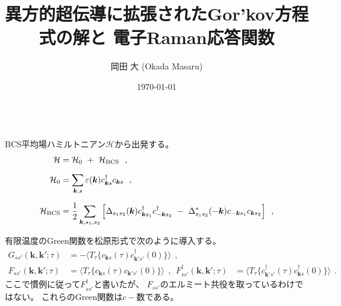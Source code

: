 \documentclass[a4j]{jsarticle}
\title{
\hspace{3em} 異方的超伝導に拡張されたGor'kov方程式の解と \newline 電子Raman応答関数
}
\author{岡田 大 (Okada Masaru)}
\date{\today}
\begin{document}
\maketitle

\ \\[-15mm]

BCS平均場ハミルトニアン$\mathcal{H}$から出発する。
\begin{align}
	\mathcal{H}
	 & =
	\mathcal{H}_{0}
	\ + \
	\mathcal{H}_{\rm BCS}
	\ \ ,
	\nonumber \\[2mm]
	\mathcal{H}_{0}
	 & =
	\sum_{\bm{k},s}
	\varepsilon(\bm{k})
	c_{\bm{k} s}^{\dagger}
	c_{\bm{k} s}
	\ \ ,
	\nonumber \\[2mm]
	\mathcal{H}_{\rm BCS}
	 & =
	\dfrac{1}{2}
	\sum_{\bm{k},s_{1},s_{2}}
	\Big[
		\Delta_{ s_{1} s_{2} }( \bm{k} )
		c_{\bm{k} s_{1}}^{\dagger}
		c_{-\bm{k} s_{2}}^{\dagger}
		\ - \
		\Delta_{ s_{1} s_{2} }^{*}( - \bm{k} )
		c_{-\bm{k} s_{1}}
		c_{\bm{k} s_{2}}
		\Big]
	\ \ ,
\end{align}

有限温度のGreen関数を松原形式で次のように導入する。
\begin{align}
	G_{ss'}(\bm{k} , \bm{k}' ; \tau)
	 & =
	-
	\langle T_{\tau} \{ c_{\bm{k}s}(\tau) c_{\bm{k}'s'}^{\dagger}(0) \} \rangle
	\ \ ,
	\\[3mm]
	F_{ss'}(\bm{k} , \bm{k}' ; \tau)
	 & =
	\langle T_{\tau} \{ c_{\bm{k}s}(\tau) c_{\bm{k}'s'}(0) \} \rangle
	\ \ , \ \
	F_{ss'}^{\dagger}(\bm{k} , \bm{k}' ; \tau)
	 & =
	\langle T_{\tau} \{ c_{\bm{k}' s' }^{\dagger}(\tau) c_{\bm{k} s }^{\dagger}(0) \} \rangle
	\ \ .
\end{align}
ここで慣例に従って$F_{ss'}^{\dagger}$と書いたが、
$F_{ss'}$のエルミート共役を取っているわけではない。
これらのGreen関数は$c-$数である。
\end{document}
